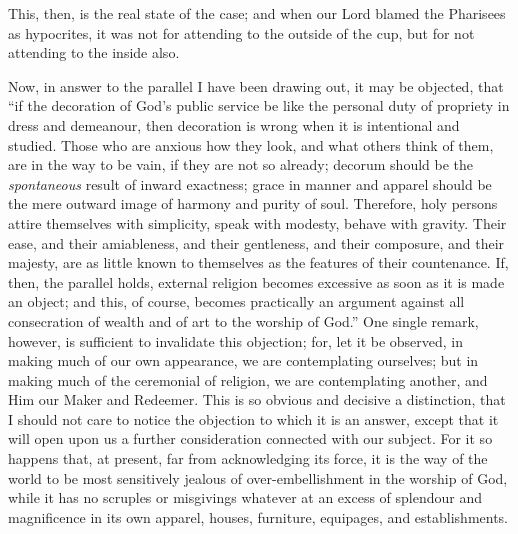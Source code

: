 This, then, is the real state of the case; and when our Lord blamed
the Pharisees as hypocrites, it was not for attending to the outside
of the cup, but for not attending to the inside also.

Now, in answer to the parallel I have been drawing out, it may be
objected, that ``if the decoration of God's public service be like
the personal duty of propriety in dress and demeanour, then decoration
is wrong when it is intentional and studied. Those who are anxious how
they look, and what others think of them, are in the way to be vain,
if they are not so already; decorum should be the \emph{spontaneous}
result of inward exactness; grace in manner and apparel should be the
mere outward image of harmony and purity of soul. Therefore, holy
persons attire themselves with simplicity, speak with modesty, behave
with gravity. Their ease, and their amiableness, and their gentleness,
and their composure, and their majesty, are as little known to
themselves as the features of their countenance. If, then, the
parallel holds, external religion becomes excessive as soon as it is
made an object; and this, of course, becomes practically an argument
against all consecration of wealth and of art to the worship of
God.'' One single remark, however, is sufficient to invalidate
this objection; for, let it be observed, in making much of our own
appearance, we are contemplating ourselves; but in making much of the
ceremonial of religion, we are contemplating another, and Him our
Maker and Redeemer. This is so obvious and decisive a distinction,
that I should not care to notice the objection to which it is an
answer, except that it will open upon us a further consideration
connected with our subject. For it so happens that, at present, far
from acknowledging its force, it is the way of the world to be most
sensitively jealous of over-embellishment in the worship of God, while
it has no scruples or misgivings whatever at an excess of splendour
and magnificence in its own apparel, houses, furniture, equipages, and
establishments.

